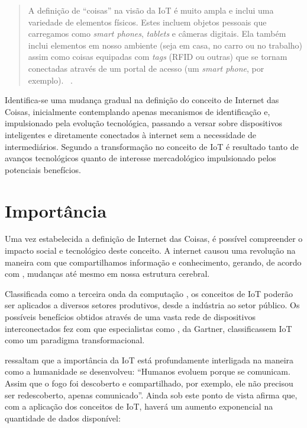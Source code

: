 \documentclass[twoside,english,brazilian]{UNISINOSmonografia}
\begin{document}
	\begin{quote}
		A definição de ``coisas'' na visão da IoT é muito ampla e inclui 
		uma variedade de elementos físicos. Estes incluem objetos pessoais 
		que carregamos como \textit{smart phones}, \textit{tablets} e 
		câmeras digitais. Ela também inclui elementos em nosso ambiente 
		(seja em casa, no carro ou no trabalho) assim como coisas 
		equipadas com \textit{tags} (RFID ou outras) que se tornam 
		conectadas através de um portal de acesso (um \textit{smart 
			phone}, por exemplo).~
		\cite{Coetzee2011}.
	\end{quote}
	
	Identifica-se uma mudança gradual na definição do conceito de Internet 
	das Coisas, inicialmente contemplando apenas mecanismos de 
	identificação e, impulsionado pela evolução tecnológica, passando a 
	versar sobre dispositivos inteligentes e diretamente conectados à 
	internet sem a necessidade de intermediários. Segundo 
	 a transformação no conceito de IoT é resultado 
	tanto de avanços tecnológicos quanto de interesse mercadológico 
	impulsionado pelos potenciais benefícios.


\section{Importância}

	Uma vez estabelecida a definição de Internet das Coisas, é possível 
	compreender o impacto social e tecnológico deste conceito. A internet 
	causou uma revolução na maneira com que compartilhamos informação e 
	conhecimento, gerando, de acordo com , mudanças 
	até mesmo em nossa estrutura cerebral.
	
	Classificada como a terceira onda da computação \cite{Register2013}, 
	os conceitos de IoT poderão ser aplicados a diversos setores 
	produtivos, desde a indústria ao setor público. Os possíveis 
	benefícios obtidos através de uma vasta rede de dispositivos 
	interconectados fez com que especialistas como , 
	da Gartner, classificassem IoT como um paradigma transformacional.
	
	 ressaltam que a importância da IoT está 
	profundamente interligada na maneira como a humanidade se desenvolveu: 
	``Humanos evoluem porque se comunicam. Assim que o fogo foi descoberto 
	e compartilhado, por exemplo, ele não precisou ser redescoberto, 
	apenas comunicado''. Ainda sob este ponto de vista afirma que, com a 
	aplicação dos conceitos de IoT, haverá um aumento exponencial na 
	quantidade de dados disponível:
	
\end{document}
